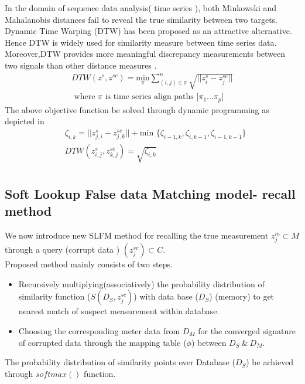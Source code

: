 \documentclass[conference]{IEEEtran}
\begin{document}
In the domain of sequence data analysis( time series ), both Minkowski and Mahalanobis distances fail to reveal the true similarity between two targets. Dynamic Time Warping (DTW)  \cite{b17} has been proposed as an attractive alternative.\\
Hence DTW is widely used for similarity measure between time series data. Moreover,DTW provides more meaningful discrepancy measurements between two signals than other distance measures \cite{b18}. \\
\begin{align*}
DTW(z^s,z^{sc})=\underset{\pi} {\text{min}}{\sum^{n}_{(i,j) \in \pi}\sqrt{||z^s_{i}-{z^{sc}_{j}}||}} \tag{2}\\
 \text{ where $\pi$ is  time series  align paths  [$\pi_1 \dots \pi_p$] }
\end{align*}
 The above objective function be solved through dynamic programming as depicted in \cite{b10}
\begin{align*}
& \zeta_{i,k}=||z^s_{j,i}-{z^{sc}_{j,k}}|| + \text{min }\{\zeta_{i-1,k},\zeta_{i,k-1},\zeta_{i-1,k-1}\}\\
 & DTW(z^s_{i,j},z^{sc}_{k,j})=\sqrt{\zeta_{i,k}}\\
\end{align*}

\subsection{Soft Lookup False data Matching model- recall method}
We now introduce new SLFM method for recalling the true measurement $z^{{m}}_{j} \subset M$ through a query (corrupt data ) $(z^{sc}_j)\subset C$.\\

Proposed method mainly consists of two steps.
\begin{itemize}
\item  Recursively multiplying(associatively) the probability distribution of similarity function ($ S(D_{S},{z^{sc}_{j}})$) with data base ($D_S$) (memory) to get nearest match of suspect measurement within database.\\
\item  Choosing the corresponding meter data from $D_M$ for the converged signature of corrupted data through the mapping table ($\phi$) between $D_S \ \& \ D_M$.
\end{itemize}

The probability distribution of similarity points over Database ($D_S$) be achieved through $softmax()$ function.\\
\end{document}
